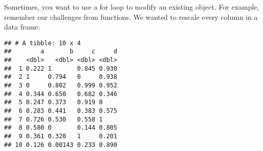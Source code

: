 \documentclass[
]{article}
\newenvironment{Shaded}{\begin{snugshade}}{\end{snugshade}}
\newcommand{\AttributeTok}[1]{\textcolor[rgb]{0.13,0.29,0.53}{#1}}
\newcommand{\ControlFlowTok}[1]{\textcolor[rgb]{0.13,0.29,0.53}{\textbf{#1}}}
\newcommand{\DecValTok}[1]{\textcolor[rgb]{0.00,0.00,0.81}{#1}}
\newcommand{\FunctionTok}[1]{\textcolor[rgb]{0.13,0.29,0.53}{\textbf{#1}}}
\newcommand{\NormalTok}[1]{#1}
\newcommand{\OtherTok}[1]{\textcolor[rgb]{0.56,0.35,0.01}{#1}}
\newcommand{\SpecialCharTok}[1]{\textcolor[rgb]{0.81,0.36,0.00}{\textbf{#1}}}
\begin{document}
Sometimes, you want to use a for loop to modify an existing object. For
example, remember our challenges from functions. We wanted to rescale
every column in a data frame:

\begin{Shaded}
\end{Shaded}

\begin{verbatim}
## # A tibble: 10 x 4
##        a       b     c     d
##    <dbl>   <dbl> <dbl> <dbl>
##  1 0.222 1       0.845 0.930
##  2 1     0.794   0     0.938
##  3 0     0.802   0.999 0.952
##  4 0.344 0.650   0.682 0.346
##  5 0.247 0.373   0.919 0    
##  6 0.283 0.441   0.383 0.575
##  7 0.726 0.530   0.558 1    
##  8 0.580 0       0.144 0.805
##  9 0.361 0.320   1     0.201
## 10 0.126 0.00143 0.233 0.890
\end{verbatim}
\end{document}
